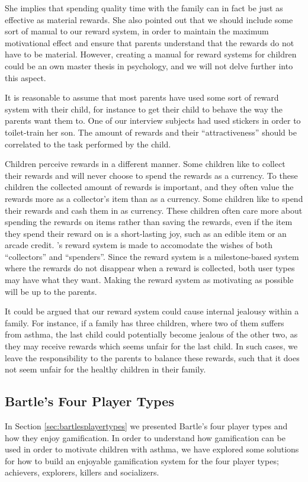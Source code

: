 She implies that spending quality time with the family can in fact be just as effective as material rewards. She also pointed out that we should include some sort of manual to our reward system, in order to maintain the maximum motivational effect and ensure that parents understand that the rewards do not have to be material. However, creating a manual for reward systems for children could be an own master thesis in psychology, and we will not delve further into this aspect. 

It is reasonable to assume that most parents have used some sort of reward system with their child, for instance to get their child to behave the way the parents want them to. One of our interview subjects had used stickers in order to toilet-train her son. The amount of rewards and their ``attractiveness'' should be correlated to the task performed by the child.

Children perceive rewards in a different manner. Some children like to collect their rewards and will never choose to spend the rewards as a currency. To these children the collected amount of rewards is important, and they often value the rewards more as a collector's item than as a currency. 
Some children like to spend their rewards and cash them in as currency. These children often care more about spending the rewards on items rather than saving the rewards, even if the item they spend their reward on is a short-lasting joy, such as an edible item or an arcade credit.
\app{}'s reward system is made to accomodate the wishes of both ``collectors'' and ``spenders''. Since the reward system is a milestone-based system where the rewards do not disappear when a reward is collected, both user types may have what they want. Making the reward system as motivating as possible will be up to the parents.

It could be argued that our reward system could cause internal jealousy within a family. For instance, if a family has three children, where two of them suffers from asthma, the last child could potentially become jealous of the other two, as they may receive rewards which seems unfair for the last child. In such cases, we leave the responsibility to the parents to balance these rewards, such that it does not seem unfair for the healthy children in their family.    

\subsection{Bartle's Four Player Types}
\label{sec:bartlesfourplayertypes}
In Section \ref{sec:bartlesplayertypes} we presented Bartle's four player types and how they enjoy gamification. In order to understand how gamification can be used in order to motivate children with asthma, we have explored some solutions for how to build an enjoyable gamification system for the four player types; achievers, explorers, killers and socializers. 


